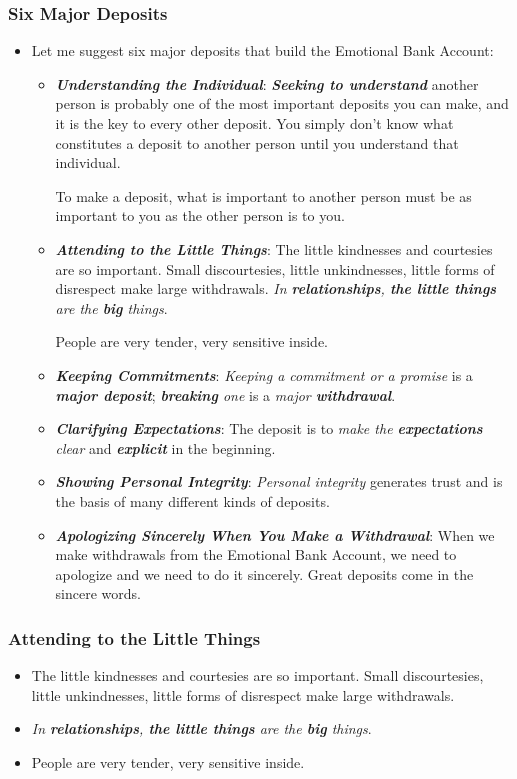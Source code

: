 \documentclass[11pt]{article}
\begin{document}
\subsubsection{Six Major Deposits}
\begin{itemize}
\item Let me suggest six major deposits that build the Emotional Bank Account:
\begin{itemize}
\item \emph{\textbf{Understanding the Individual}}: \emph{\textbf{Seeking to understand}} another person is probably one of the most important deposits you can make, and it is the key to every other deposit. You simply don't know what constitutes a deposit to another person until you understand that individual.

To make a deposit, what is important to another person must be as important to you as the other person is to you. 

\item \emph{\textbf{Attending to the Little Things}}: The little kindnesses and courtesies are so important. Small discourtesies, little unkindnesses, little forms of disrespect make large withdrawals. \emph{In \textbf{relationships}, \textbf{the little things} are the \textbf{big} things}.

People are very tender, very sensitive inside.

\item \emph{\textbf{Keeping Commitments}}: \emph{Keeping a commitment or a promise} is a \emph{\textbf{major deposit}}; \emph{\textbf{breaking} one} is a \emph{major \textbf{withdrawal}}. 

\item \emph{\textbf{Clarifying Expectations}}: The deposit is to \emph{make the \textbf{expectations} clear} and \emph{\textbf{explicit}} in the beginning.


\item  \emph{\textbf{Showing Personal Integrity}}: \emph{Personal integrity} generates trust and is the basis of many different kinds of deposits.

\item \emph{\textbf{Apologizing Sincerely When You Make a Withdrawal}}: When we make withdrawals from the Emotional Bank Account, we need to apologize and we need to do it sincerely. Great deposits come in the sincere words.
\end{itemize}
\end{itemize}
\subsubsection{Attending to the Little Things}
\begin{itemize}
\item The little kindnesses and courtesies are so important. Small discourtesies, little unkindnesses, little forms of disrespect make large withdrawals.

\item  \emph{In \textbf{relationships}, \textbf{the little things} are the \textbf{big} things}.

\item People are very tender, very sensitive inside.
\end{itemize}
\end{document}
